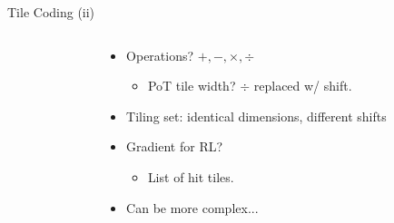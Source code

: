 \documentclass[aspectratio=169,xcolor={dvipsnames}
,handout
]{beamer}
\begin{document}
\begin{frame}{Tile Coding (ii)}
\begin{columns}
\begin{column}{0.6\linewidth}
{\begin{tikzpicture}
				\end{tikzpicture}
			}
		\end{column}
		\begin{column}{0.4\linewidth}
			\begin{itemize}[<+->]
				\item Operations? $+, -, \times, \div$
				\begin{itemize}[<+->]
					\item PoT tile width? $\div$ replaced w/ shift.
				\end{itemize}
				\item Tiling set: identical dimensions, different shifts
				\item Gradient for RL?
				\begin{itemize}[<+->]
					\item List of hit tiles.
				\end{itemize}
				\item Can be more complex...
			\end{itemize}
		\end{column}
	\end{columns}
\end{frame}
\end{document}
